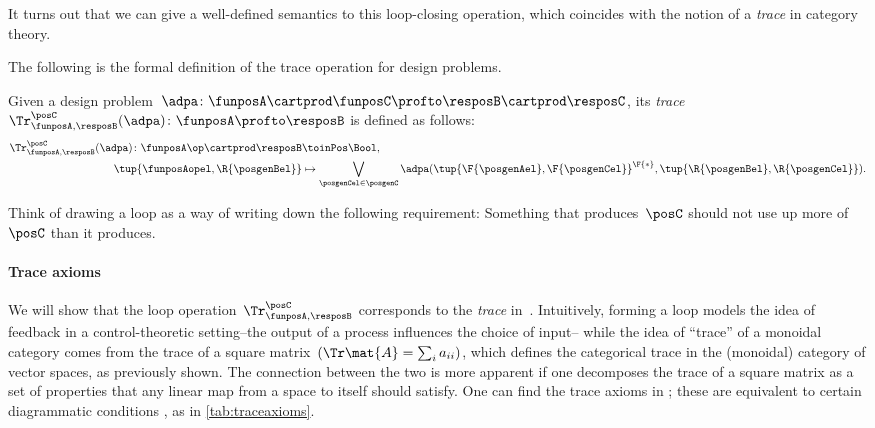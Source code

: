 It turns out that we can give a well-defined semantics to this loop-closing operation, which coincides with the notion of a \emph{trace} in category theory.

The following is the formal definition of the trace operation for design problems.

\begin{definition}
    \label{def:dp-trace}
    Given a design problem~$\adpa\colon \funposA \cartprod \funposC \profto \resposB \cartprod \resposC$, its \emph{trace}~$\Tr_{\funposA,\resposB}^\posC(\adpa) \colon \funposA \profto \resposB$ is defined as follows:
    \begin{equation}
        \label{eq:tracedef}
        \begin{aligned}
            \Tr_{\funposA,\resposB}^\posC(\adpa) \colon  \funposA\op \cartprod \resposB & \toinPos \Bool,                           \\
            \tup{\funposAopel, \R{\posgenBel}}                                          & \mapsto \bigvee_{\posgenCel \in \posgenC}
            \adpa(\tup{\F{\posgenAel}, \F{\posgenCel}}^\F{*},
            \tup{\R{\posgenBel}, \R{\posgenCel}}).
        \end{aligned}
    \end{equation}
\end{definition}

Think of drawing a loop as a way of writing down the following requirement:
Something that produces~$\posC$ should not use up more of~$\posC$ than it produces.


\paragraph{Trace axioms}
We will show that the loop operation~$\Tr_{\funposA,\resposB}^\posC$ corresponds to the \emph{trace} in~\DP.
Intuitively, forming a loop models the idea of feedback in a control-theoretic setting--the output of a process influences the choice of input--
while the idea of ``trace'' of a monoidal category comes from the trace of a square matrix~$(\Tr\mat{A} = \sum_i a_{ii})$, which defines the categorical trace in the (monoidal) category of vector spaces, as previously shown.
The connection between the two is more apparent if one decomposes the trace of a square matrix as a set of properties that any linear map from a space to itself should satisfy.
One can find the trace axioms in  \cite{mac2013categories};
these are equivalent to certain diagrammatic conditions \cite{joyal96}, as in \cref{tab:traceaxioms}.

